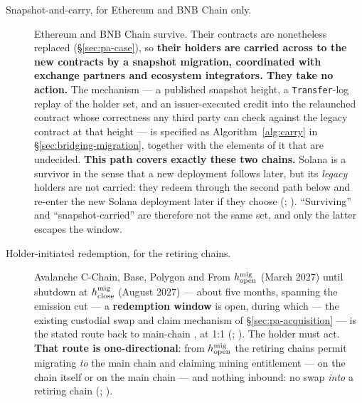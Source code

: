 \begin{description}
\item[Snapshot-and-carry, for Ethereum and BNB Chain only.] Ethereum and BNB Chain survive. Their contracts
  are nonetheless replaced (\S\ref{sec:pa-case}), so \textbf{their holders are carried across to the
  new contracts by a snapshot migration, coordinated with exchange partners and ecosystem
  integrators. They take no action.} The mechanism — a published snapshot height, a
  \texttt{Transfer}-log replay of the holder set, and an issuer-executed credit into the relaunched
  contract whose correctness any third party can check against the legacy contract at that height —
  is specified as Algorithm~\ref{alg:carry} in \S\ref{sec:bridging-migration}, together with the
  elements of it that are undecided. \textbf{This path covers exactly these two chains.} Solana is a
  survivor in the sense that a new deployment follows later, but its \emph{legacy} holders are not
  carried: they redeem through the second path below and re-enter the new Solana deployment later if
  they choose (\planned; ). ``Surviving'' and
  ``snapshot-carried'' are therefore not the same set, and only the latter escapes the window.
\item[Holder-initiated redemption, for the retiring chains.] Avalanche C-Chain, Base, Polygon and
   From $h^{\mathrm{mig}}_{\mathrm{open}}$ (March 2027) until shutdown at $h^{\mathrm{mig}}_{\mathrm{close}}$ (August
  2027) --- about five months, spanning the emission cut --- a \textbf{redemption window} is open, during
  which \Fusion — the existing custodial swap and claim mechanism of \S\ref{sec:pa-acquisition} — is
  the stated route back to main-chain \flux, at 1:1 (\planned;
  ). The holder must act. \textbf{That route is
  one-directional}: from $h^{\mathrm{mig}}_{\mathrm{open}}$ the retiring chains permit migrating \emph{to} the main chain and
  claiming mining entitlement --- on the chain itself or on the main chain --- and nothing inbound:
  no swap \emph{into} a retiring chain  (\planned;
  ).
\end{description}

